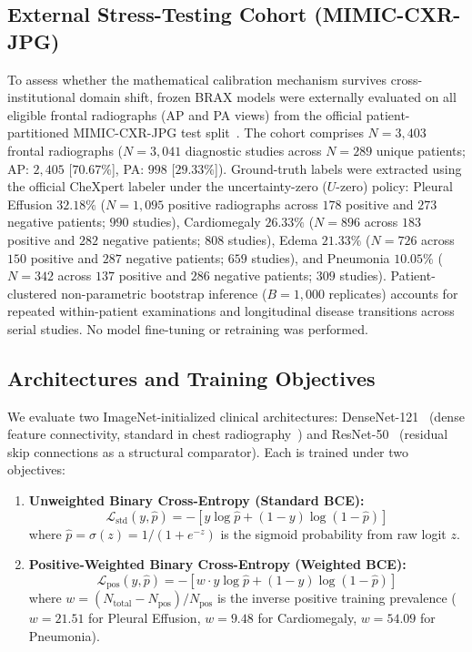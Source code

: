 \documentclass[preprint,12pt]{elsarticle}
\begin{document}
\subsection{External Stress-Testing Cohort (MIMIC-CXR-JPG)}
To assess whether the mathematical calibration mechanism survives cross-institutional domain shift, frozen BRAX models were externally evaluated on all eligible frontal radiographs (AP and PA views) from the official patient-partitioned MIMIC-CXR-JPG test split~\cite{johnson2019mimic,johnson2019mimicjpg}. The cohort comprises $N = 3,403$ frontal radiographs ($N = 3,041$ diagnostic studies across $N = 289$ unique patients; AP: $2,405$ [$70.67\%$], PA: $998$ [$29.33\%$]). Ground-truth labels were extracted using the official CheXpert labeler under the uncertainty-zero ($U\text{-zero}$) policy: Pleural Effusion $32.18\%$ ($N = 1,095$ positive radiographs across $178$ positive and $273$ negative patients; $990$ studies), Cardiomegaly $26.33\%$ ($N = 896$ across $183$ positive and $282$ negative patients; $808$ studies), Edema $21.33\%$ ($N = 726$ across $150$ positive and $287$ negative patients; $659$ studies), and Pneumonia $10.05\%$ ($N = 342$ across $137$ positive and $286$ negative patients; $309$ studies). Patient-clustered non-parametric bootstrap inference ($B=1,000$ replicates) accounts for repeated within-patient examinations and longitudinal disease transitions across serial studies. No model fine-tuning or retraining was performed.

\subsection{Architectures and Training Objectives}
We evaluate two ImageNet-initialized clinical architectures: DenseNet-121~\cite{densenet2017huang} (dense feature connectivity, standard in chest radiography~\cite{rajpurkar2017chexnet}) and ResNet-50~\cite{resnet2016he} (residual skip connections as a structural comparator). Each is trained under two objectives:
\begin{enumerate}
    \item \textbf{Unweighted Binary Cross-Entropy (Standard BCE):}
    \begin{equation}
    \mathcal{L}_{\text{std}}(y, \hat{p}) = - [y \log \hat{p} + (1 - y) \log(1 - \hat{p})]
    \end{equation}
    where $\hat{p} = \sigma(z) = 1 / (1 + e^{-z})$ is the sigmoid probability from raw logit $z$.
    \item \textbf{Positive-Weighted Binary Cross-Entropy (Weighted BCE):}
    \begin{equation}
    \mathcal{L}_{\text{pos}}(y, \hat{p}) = - [w \cdot y \log \hat{p} + (1 - y) \log(1 - \hat{p})]
    \end{equation}
    where $w = (N_{\text{total}} - N_{\text{pos}}) / N_{\text{pos}}$ is the inverse positive training prevalence ($w = 21.51$ for Pleural Effusion, $w = 9.48$ for Cardiomegaly, $w = 54.09$ for Pneumonia).
\end{enumerate}
\end{document}

